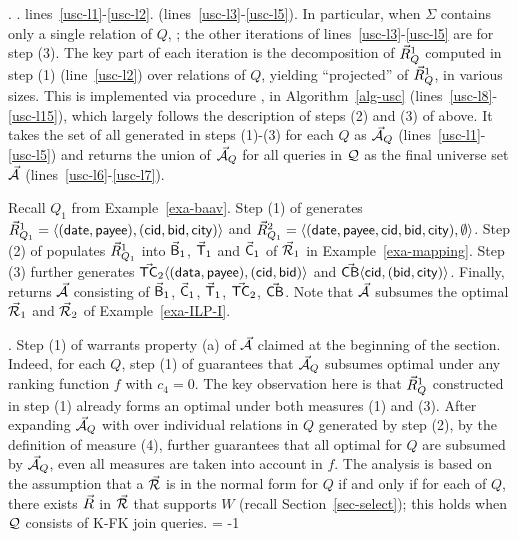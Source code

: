 .
.
 lines~\ref{usc-l1}-\ref{usc-l2}.
 (lines~\ref{usc-l3}-\ref{usc-l5}).
In particular, when $\Sigma$
contains only a single relation of $Q$, ;
the other iterations of lines~\ref{usc-l3}-\ref{usc-l5} are for 
step (3). The key part of each iteration is the decomposition of
$\vec{R}_{Q}^{1}$ computed in step (1) (line~\ref{usc-l2}) over
relations of $Q$, yielding ``projected'' \bss of
$\vec{R}_{Q}^{1}$, in various sizes. This is implemented via
procedure \decompose, 
in Algorithm~\ref{alg-usc} (lines~\ref{usc-l8}-\ref{usc-l15}), which
largely follows the description of steps (2) and (3) of above.
It takes the set of all \bss generated in steps (1)-(3) for
each $Q$ as $\vec{{\mathcal A}}_{Q}$ (lines~\ref{usc-l1}-\ref{usc-l5}) and
returns the union of $\vec{{\mathcal A}}_{Q}$ for all queries in $\mathcal Q$ as the
final universe set $\vec{{\mathcal A}}$ (lines~\ref{usc-l6}-\ref{usc-l7}).


\begin{example}\label{exa-usc}
Recall $Q_{1}$ from Example~\ref{exa-baav}.
Step (1) of \usc generates $\vec{R}_{Q_{1}}^{1} \allowbreak =\allowbreak
\langle (\protect\mathsf{date}, \allowbreak \protect\mathsf{payee}),\allowbreak (\protect\mathsf{cid}, \allowbreak \protect\mathsf{bid},
  \allowbreak \protect\mathsf{city})\rangle$ and 
$\vec{R}_{Q_{1}}^{2} = \langle (\protect\mathsf{date}, \allowbreak \protect\mathsf{payee},
  \protect\mathsf{cid}, \allowbreak \protect\mathsf{bid}, \allowbreak \protect\mathsf{city}),\allowbreak \emptyset\rangle$. 
Step (2) of \usc populates $\vec{R}_{Q_{1}}^{1}$ into 
$\vec{\protect\mathsf{B}}_{1}$, $\vec{\protect\mathsf{T}}_{1}$ and $\vec{\protect\mathsf{C}}_{1}$ of
$\vec{{\mathcal R}}_{1}$ in Example~\ref{exa-mapping}.
Step (3) further generates $\vec{\protect\mathsf{TC}}_{2}\langle (\protect\mathsf{data},\allowbreak
  \protect\mathsf{payee}),\allowbreak (\protect\mathsf{cid},\allowbreak \protect\mathsf{bid})\rangle$ and 
$\vec{\protect\mathsf{CB}}\langle \protect\mathsf{cid},\allowbreak (\protect\mathsf{bid},\allowbreak \protect\mathsf{city})\rangle$.
Finally, \opts returns $\vec{{\mathcal A}}$ consisting of 
$\vec{\protect\mathsf{B}}_{1}$, $\vec{\protect\mathsf{C}}_{1}$, $\vec{\protect\mathsf{T}}_{1}$,
$\vec{\protect\mathsf{TC}}_{2}$, $\vec{\protect\mathsf{CB}}$.
Note that $\vec{{\mathcal A}}$ subsumes the optimal \bds $\vec{{\mathcal R}}_{1}$ and
$\vec{{\mathcal R}}_{2}$ of Example~\ref{exa-ILP-I}.
\end{example}

\vspace{-0.7ex}


.
Step (1) of \usc warrants property (a) of $\vec{{\mathcal A}}$ claimed at
the beginning of the section. Indeed, for each $Q$, step (1) of
\usc guarantees that $\vec{{\mathcal A}}_{Q}$ subsumes optimal \bdss under
any ranking function $f$ with $c_{4} = 0$. The key observation
here is that $\vec{R}_{Q}^{1}$ constructed in step (1) already forms an
optimal \bds under both measures (1) and (3).
After expanding $\vec{{\mathcal A}}_{Q}$ with \bss over individual relations
in $Q$ generated by step (2), by the definition of measure (4),
\usc further guarantees that all optimal \bdss for $Q$ are subsumed by
$\vec{{\mathcal A}}_{Q}$, even all measures are taken into account in $f$.
The analysis is based on the assumption that a \bds $\vec{{\mathcal R}}$ is
in the normal form for $Q$ if and only if for each \qcs of $Q$, there
exists \bs $\vec{R}$ in $\vec{{\mathcal R}}$ that supports $W$ (recall
Section~\ref{sec-select}); this holds when $\mathcal Q$
consists of K-FK join \SPC queries.
\looseness = -1

